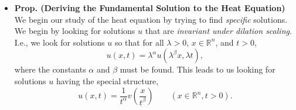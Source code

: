 \documentclass{article}
\begin{document}
\begin{itemize}
		\item \textbf{Prop. (Deriving the Fundamental Solution to the Heat Equation)} We begin our study of the heat equation by trying to find \textit{specific} solutions. We begin by looking for solutions $u$ that are \textit{invariant under dilation scaling}. I.e., we look for solutions $u$ so that for all $\lambda > 0$, $x \in \mathbb{R}^{n}$, and $t > 0$, 
		\begin{equation*}
			u(x, t) = \lambda^{\alpha}u(\lambda^{\beta}x, \lambda t), 
		\end{equation*}
		where the constants $\alpha$ and $\beta$ must be found. This leads to us looking for solutions $u$ having the special structure, 
		\begin{equation*}
			u(x, t) = \frac{1}{t^{\alpha}}v\left(\frac{x}{t^{\beta}}\right) \qquad (x \in\mathbb{R}^{n}, t > 0). 
		\end{equation*}
	\end{itemize}
	
	\newpage 
\end{document}
